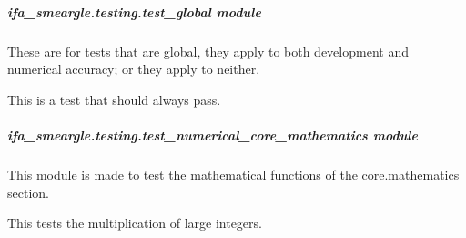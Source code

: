 \documentclass[letterpaper,10pt,english]{sphinxmanual}
\begin{document}
\subparagraph{ifa\_smeargle.testing.test\_global module}
\label{\detokenize{docstrings/ifa_smeargle.testing.test_global:module-ifa_smeargle.testing.test_global}}\label{\detokenize{docstrings/ifa_smeargle.testing.test_global:ifa-smeargle-testing-test-global-module}}\label{\detokenize{docstrings/ifa_smeargle.testing.test_global::doc}}
These are for tests that are global, they apply to both
development and numerical accuracy; or they apply to neither.

\begin{fulllineitems}
\label{\detokenize{docstrings/ifa_smeargle.testing.test_global:ifa_smeargle.testing.test_global.test_pass}}
This is a test that should always pass.

\end{fulllineitems}



\subparagraph{ifa\_smeargle.testing.test\_numerical\_core\_mathematics module}
\label{\detokenize{docstrings/ifa_smeargle.testing.test_numerical_core_mathematics:module-ifa_smeargle.testing.test_numerical_core_mathematics}}\label{\detokenize{docstrings/ifa_smeargle.testing.test_numerical_core_mathematics:ifa-smeargle-testing-test-numerical-core-mathematics-module}}\label{\detokenize{docstrings/ifa_smeargle.testing.test_numerical_core_mathematics::doc}}
This module is made to test the mathematical functions of the
core.mathematics section.

\begin{fulllineitems}
\label{\detokenize{docstrings/ifa_smeargle.testing.test_numerical_core_mathematics:ifa_smeargle.testing.test_numerical_core_mathematics.test_ifas_large_integer_array_product}}
This tests the multiplication of large integers.

\end{fulllineitems}
\end{document}
